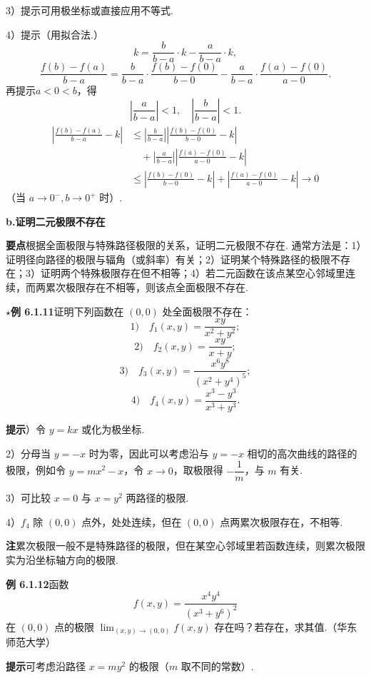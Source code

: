\documentclass[UTF8,12pt,a4paper,fontset=fandol]{ctexart}
\begin{document}
3）提示\quad 可用极坐标或直接应用不等式.

4）提示\quad （用拟合法.）
\[
  k=\frac{b}{b-a}\cdot k-\frac{a}{b-a}\cdot k,
\]
\[
  \frac{f(b)-f(a)}{b-a}
  =\frac{b}{b-a}\cdot\frac{f(b)-f(0)}{b-0}
  -\frac{a}{b-a}\cdot\frac{f(a)-f(0)}{a-0}.
\]
再提示\quad $a<0<b$，得
\[
  \left|\frac{a}{b-a}\right|<1,\quad
  \left|\frac{b}{b-a}\right|<1.
\]
\[
\begin{aligned}
\left|\frac{f(b)-f(a)}{b-a}-k\right|
&\le \left|\frac{b}{b-a}\right|
\left|\frac{f(b)-f(0)}{b-0}-k\right|\\
&\quad+\left|\frac{a}{b-a}\right|
\left|\frac{f(a)-f(0)}{a-0}-k\right|\\
&\le \left|\frac{f(b)-f(0)}{b-0}-k\right|
+\left|\frac{f(a)-f(0)}{a-0}-k\right|\to0
\end{aligned}
\]
（当 $a\to0^-,b\to0^+$ 时）.

\noindent\textbf{b.\quad 证明二元极限不存在}

\noindent\textbf{要点}\quad 根据全面极限与特殊路径极限的关系，证明二元极限不存在. 通常方法是：1）证明径向路径的极限与辐角（或斜率）有关；2）证明某个特殊路径的极限不存在；3）证明两个特殊极限存在但不相等；4）若二元函数在该点某空心邻域里连续，而两累次极限存在不相等，则该点全面极限不存在.

\noindent\textbf{$\star$例 6.1.11}\quad 证明下列函数在 $(0,0)$ 处全面极限不存在：
\[
  1)\quad f_1(x,y)=\frac{xy}{x^2+y^2};
\]
\[
  2)\quad f_2(x,y)=\frac{xy}{x+y};
\]
\[
  3)\quad f_3(x,y)=\frac{x^6y^8}{(x^2+y^4)^5};
\]
\[
  4)\quad f_4(x,y)=\frac{x^3-y^3}{x^3+y^3}.
\]

\noindent\textbf{提示}）令 $y=kx$ 或化为极坐标.

2）分母当 $y=-x$ 时为零，因此可以考虑沿与 $y=-x$ 相切的高次曲线的路径的极限，例如令 $y=mx^2-x$，令 $x\to0$，取极限得 $-\dfrac1m$，与 $m$ 有关.

3）可比较 $x=0$ 与 $x=y^2$ 两路径的极限.

4）$f_4$ 除 $(0,0)$ 点外，处处连续，但在 $(0,0)$ 点两累次极限存在，不相等.

\noindent\textbf{注}\quad 累次极限一般不是特殊路径的极限，但在某空心邻域里若函数连续，则累次极限实为沿坐标轴方向的极限.

\noindent\textbf{例 6.1.12}\quad 函数
\[
  f(x,y)=\frac{x^4y^4}{(x^3+y^6)^2}
\]
在 $(0,0)$ 点的极限 $\displaystyle\lim_{(x,y)\to(0,0)}f(x,y)$ 存在吗？若存在，求其值.（华东师范大学）

\noindent\textbf{提示}\quad 可考虑沿路径 $x=my^2$ 的极限（$m$ 取不同的常数）.
\end{document}
